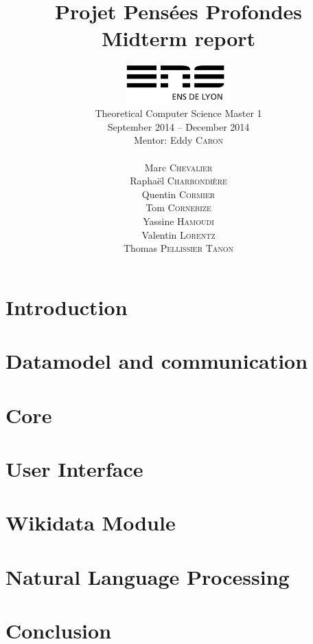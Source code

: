\documentclass[a4paper,10pt]{report}
\title{Projet Pensées Profondes\\\large Midterm report}
\author{\includegraphics[width=0.3\textwidth]{../logo_ensl.pdf}\\[50pt]
Theoretical Computer Science Master 1\\September 2014 \--- December 2014\\[50pt]
Mentor: Eddy \textsc{Caron}\\[50pt]
\begin{minipage}{0.4\textwidth}
    \begin{flushleft} \large
        Marc \textsc{Chevalier}
        \\
        Raphaël \textsc{Charrondière}
        \\
        Quentin \textsc{Cormier}
        \\
        Tom \textsc{Cornebize}
    \end{flushleft}
\end{minipage}
\begin{minipage}{0.4\textwidth}
    \begin{flushright} \large
        Yassine \textsc{Hamoudi}
        \\
        Valentin \textsc{Lorentz}
        \\
        Thomas \textsc{Pellissier Tanon}
        \\
    \end{flushright}
\end{minipage}
}
\date{}
\begin{document}
\maketitle



\tableofcontents

\chapter*{Introduction}


\chapter{Datamodel and communication}


\chapter{Core}


\chapter{User Interface}


\chapter{Wikidata Module}


\chapter{Natural Language Processing}





\chapter*{Conclusion}


\appendix
\end{document}
